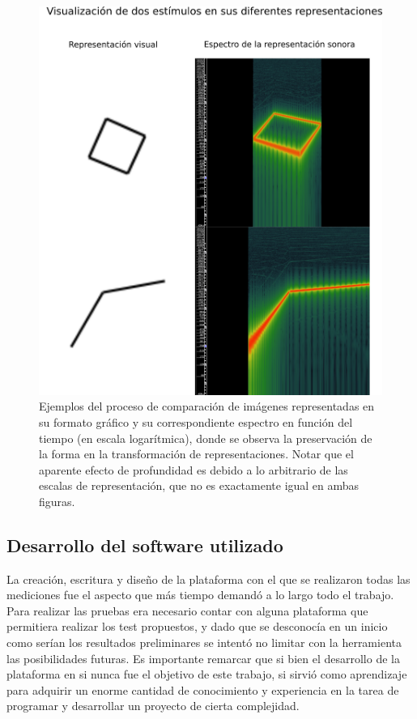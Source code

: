 \documentclass{article}
\numberwithin{figure}{section}
\begin{document}
    \begin{figure}
        \center
        \includegraphics[width=\textwidth]{Imagenes/TranformacionSVG.png}
        \caption{Ejemplos del proceso de comparación de imágenes representadas en su formato gráfico y su correspondiente espectro en función del tiempo (en escala logarítmica), donde se observa la preservación de la forma en la transformación de representaciones. Notar que el aparente efecto de profundidad es debido a lo arbitrario de las escalas de representación, que no es exactamente igual en ambas figuras.}
        \label{fig:TransformacionSVG}
    \end{figure}

    
\subsection{Desarrollo del software utilizado}

    La creación, escritura y diseño de la plataforma con el que se realizaron todas las mediciones fue el aspecto que más tiempo demandó a lo largo todo el trabajo. Para realizar las pruebas era necesario contar con alguna plataforma que permitiera realizar los test propuestos, y dado que se desconocía en un inicio como serían los resultados preliminares se intentó no limitar con la herramienta las posibilidades futuras. Es importante remarcar que si bien el desarrollo de la plataforma en si nunca fue el objetivo de este trabajo, si sirvió como aprendizaje para adquirir un enorme cantidad de conocimiento y experiencia en la tarea de programar y desarrollar un proyecto de cierta complejidad. 
    
\end{document}
